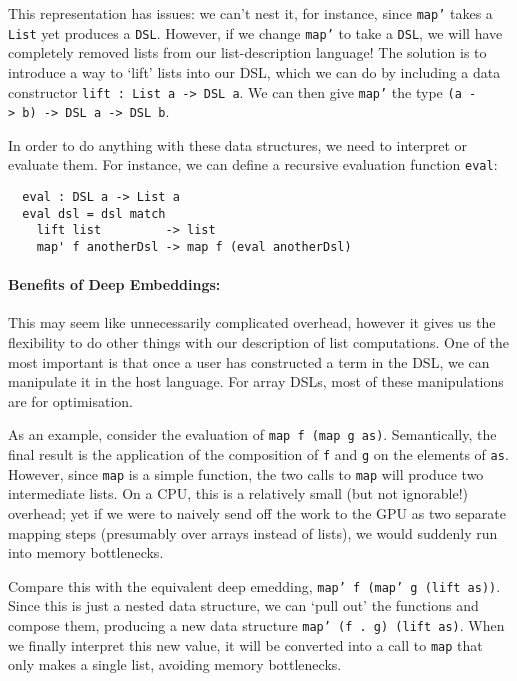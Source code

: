 \documentclass[a4paper,12pt]{article}
\newcommand{\icf}[1]{\mbox{\texttt{#1}}}
\begin{document}
This representation has issues: we can't nest it, for instance, since \icf{map'} takes a \icf{List} yet produces a \icf{DSL}. 
However, if we change \icf{map'} to take a \icf{DSL}, we will have completely removed lists from our list-description language! 
The solution is to introduce a way to `lift' lists into our DSL, which we can do by  including a data constructor \texttt{lift\ :\ List\ a\ ->\ DSL\ a}. 
We can then give \icf{map'} the type \icf{(a\ ->\ b)\ ->\ DSL\ a\ ->\ DSL\ b}.

In order to do anything with these data structures, we need to interpret or evaluate them. 
For instance, we can define a recursive evaluation function \icf{eval}:

\begin{verbatim}
  eval : DSL a -> List a
  eval dsl = dsl match
    lift list         -> list
    map' f anotherDsl -> map f (eval anotherDsl)
\end{verbatim}

\paragraph*{Benefits of Deep Embeddings:}
This may seem like unnecessarily complicated overhead, however it gives us the flexibility to do other things with our description of list computations. 
One of the most important is that once a user has constructed a term in the DSL, we can manipulate it in the host language. 
For array DSLs, most of these manipulations are for optimisation.

As an example, consider the evaluation of \icf{map\ f\ (map\ g\ as)}. 
Semantically, the final result is the application of the composition of \icf{f} and \icf{g} on the elements of \icf{as}. 
However, since \icf{map} is a simple function, the two calls to \icf{map} will produce two intermediate lists. 
On a CPU, this is a relatively small (but not ignorable!) overhead; yet if we were to naively send off the work to the GPU as two separate mapping steps (presumably over arrays instead of lists), we would suddenly run into memory bottlenecks.

Compare this with the equivalent deep emedding, \icf{map'\ f\ (map'\ g\ (lift\ as))}. 
Since this is just a nested data structure, we can `pull out' the functions and compose them, producing a new data structure \icf{map'\ (f\ .\ g)\ (lift\ as)}.
When we finally interpret this new value, it will be converted into a call to \icf{map} that only makes a single list, avoiding memory bottlenecks.
\end{document}
